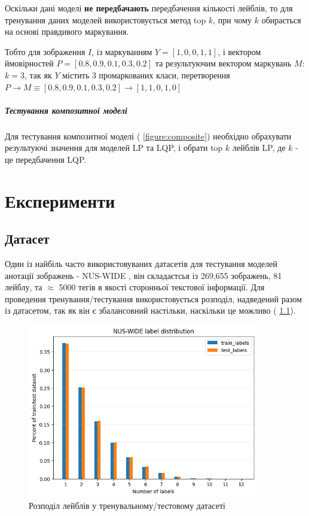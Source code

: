 \documentclass{udstu}
\begin{document}
Оскільки дані моделі \textbf{не передбачають} передбачення кількості лейблів,
то для тренування даних моделей використовується метод top $k$, при чому
$k$ обирається на основі правдивого маркування.

\label{dynk}

Тобто для зображення $I$,
із маркуванням $Y = [1,0,0,1,1]$,
і вектором ймовірностей $P = [0.8,0.9,0.1,0.3,0.2]$
та результуючим вектором маркувань $M$:
$k = 3$, так як $Y$ містить 3 промаркованих класи,
перетворення $P \to M \equiv [0.8,0.9,0.1,0.3,0.2] \to [1,1,0,1,0]$


\paragraph{\textbf{Тестування композитної моделі}\\}

Для тестування композитної моделі (\figurename{ \ref{figure:composite}})
необхідно обрахувати результуючі значення для моделей LP та LQP, і обрати
top $k$ лейблів LP, де $k$ - це передбачення LQP.


\chapter{Експерименти}

\section{Датасет}

Один із найбіль часто використовуваних датасетів для тестування моделей анотації зображень - NUS-WIDE \cite{nus-wide-civr09},
він складаєтсья із 269,655 зображень, 81 лейблу, та $\approx$ 5000 тегів в якості сторонньої текстової інформації.
Для проведення тренування/тестування використовується розподіл, надведений разом із
датасетом, так як він є збалансовний настільки, наскільки це можливо (\figurename{ \ref{figure:nus-wide-dist}}).

\begin{figure}[!ht]
	\centering
	\includegraphics[width=0.9\textwidth]{PNG/nus-wide-dist}
	\caption{Розподіл лейблів у тренувальному/тестовому датасеті}
	\label{figure:nus-wide-dist}
\end{figure}
\end{document}
